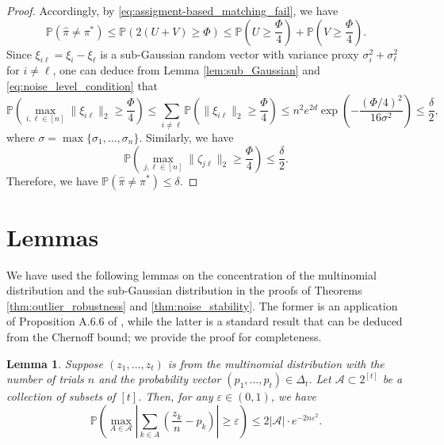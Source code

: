 \documentclass[11pt,letterpaper]{article}
\newtheorem{lemma}{Lemma} %
\theoremstyle{definition}
\numberwithin{equation}{section}
\newcommand{\cA}{\mathcal{A}}
\renewcommand{\P}{\mathbb{P}}
\renewcommand{\epsilon}{\varepsilon}
\begin{document}
\begin{proof}
    Accordingly, by \eqref{eq:assigment-based_matching_fail}, we have 
    \begin{equation*}
        \P(\hat{\pi} \neq \pi^\ast) \le \P(2 (U + V) \ge \Phi) \le \P\left(U \ge \frac{\Phi}{4}\right) + \P\left(V \ge \frac{\Phi}{4}\right).
    \end{equation*}
    Since $\xi_{i \ell} = \xi_i - \xi_\ell$ is a sub-Gaussian random vector with variance proxy $\sigma_i^2 + \sigma_\ell^2$ for $i \neq \ell$, one can deduce from Lemma \ref{lem:sub_Gaussian} and \eqref{eq:noise_level_condition} that 
    \begin{equation*}
        \P\left(\max_{i, \ell \in [n]} \|\xi_{i \ell}\|_2 \ge \frac{\Phi}{4}\right) \le \sum_{i \neq \ell} \P\left(\|\xi_{i \ell}\|_2 \ge \frac{\Phi}{4}\right) \le n^2 e^{2 d} \exp\left(-\frac{(\Phi / 4)^2}{16 \sigma^2}\right) \le \frac{\delta}{2},
    \end{equation*}
    where $\sigma = \max\{\sigma_1, \ldots, \sigma_n\}$. Similarly, we have
    \begin{equation*}
        \P\left(\max_{j, \ell \in [n]} \|\zeta_{j \ell}\|_2 \ge \frac{\Phi}{4}\right) \le \frac{\delta}{2}.
    \end{equation*}
    Therefore, we have $\P(\hat{\pi} \neq \pi^\ast) \le \delta$.
\end{proof}


\section{Lemmas}
\label{sec:lemmas}
We have used the following lemmas on the concentration of the multinomial distribution and the sub-Gaussian distribution in the proofs of Theorems \ref{thm:outlier_robustness} and \ref{thm:noise_stability}. The former is an application of Proposition A.6.6 of \cite{vaart_wellner_1996}, while the latter is a standard result that can be deduced from the Chernoff bound; we provide the proof for completeness.

\begin{lemma}
    \label{lem:multinomial_concentration}
    Suppose $(z_1, \ldots, z_t)$ is from the multinomial distribution with the number of trials $n$ and the probability vector $(p_1, \ldots, p_t) \in \Delta_t$. Let $\cA \subset 2^{[t]}$ be a collection of subsets of $[t]$. Then, for any $\epsilon \in (0, 1)$, we have
    \begin{equation*}
        \P\left(\max_{A \in \cA} \left|\sum_{k \in A} \left(\frac{z_k}{n} - p_k\right)\right| \ge \epsilon\right) \le 2 |\cA| \cdot e^{-2 n \epsilon^2}.
    \end{equation*}
\end{lemma}
\end{document}
